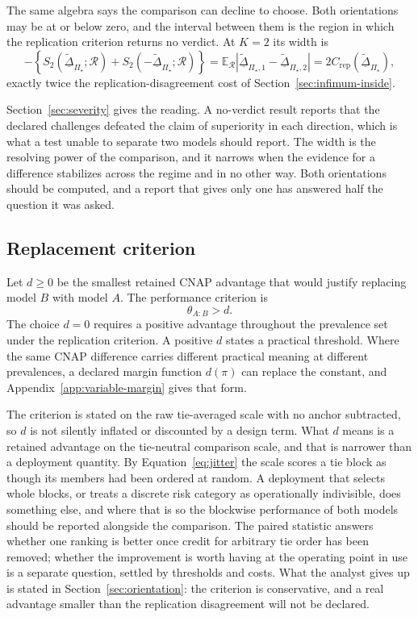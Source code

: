 \documentclass[11pt]{article}
\newcommand{\Regime}{\mathcal{R}}
\newcommand{\PSet}{\Pi_\star}
\newcommand{\E}{\mathbb{E}}
\newcommand{\RobDta}{\underline{\widetilde{\Delta}}_{\PSet}}
\theoremstyle{remark}
\begin{document}
The same algebra says the comparison can decline to choose. Both orientations may be at or below zero, and the interval between them is the region in which the replication criterion returns no verdict. At $K=2$ its width is
\[
-\left\{
S_2(\RobDta;\Regime)+S_2(-\RobDta;\Regime)
\right\}
=
\E_{\Regime}
\left|
\underline{\widetilde{\Delta}}_{\PSet,1}
-
\underline{\widetilde{\Delta}}_{\PSet,2}
\right|
=
2C_{\mathrm{rep}}(\RobDta),
\]
exactly twice the replication-disagreement cost of Section~\ref{sec:infimum-inside}.

Section~\ref{sec:severity} gives the reading. A no-verdict result reports that the declared challenges defeated the claim of superiority in each direction, which is what a test unable to separate two models should report. The width is the resolving power of the comparison, and it narrows when the evidence for a difference stabilizes across the regime and in no other way. Both orientations should be computed, and a report that gives only one has answered half the question it was asked.

\subsection{Replacement criterion}
\label{sec:replacement}

Let $d\geq0$ be the smallest retained CNAP advantage that would justify replacing model $B$ with model $A$. The performance criterion is
\begin{equation}
\theta_{A:B}>d.
\label{eq:replacement}
\end{equation}
The choice $d=0$ requires a positive advantage throughout the prevalence set under the replication criterion. A positive $d$ states a practical threshold. Where the same CNAP difference carries different practical meaning at different prevalences, a declared margin function $d(\pi)$ can replace the constant, and Appendix~\ref{app:variable-margin} gives that form.

The criterion is stated on the raw tie-averaged scale with no anchor subtracted, so $d$ is not silently inflated or discounted by a design term. What $d$ means is a retained advantage on the tie-neutral comparison scale, and that is narrower than a deployment quantity. By Equation~\eqref{eq:jitter} the scale scores a tie block as though its members had been ordered at random. A deployment that selects whole blocks, or treats a discrete risk category as operationally indivisible, does something else, and where that is so the blockwise performance of both models should be reported alongside the comparison. The paired statistic answers whether one ranking is better once credit for arbitrary tie order has been removed; whether the improvement is worth having at the operating point in use is a separate question, settled by thresholds and costs. What the analyst gives up is stated in Section~\ref{sec:orientation}: the criterion is conservative, and a real advantage smaller than the replication disagreement will not be declared.
\end{document}
